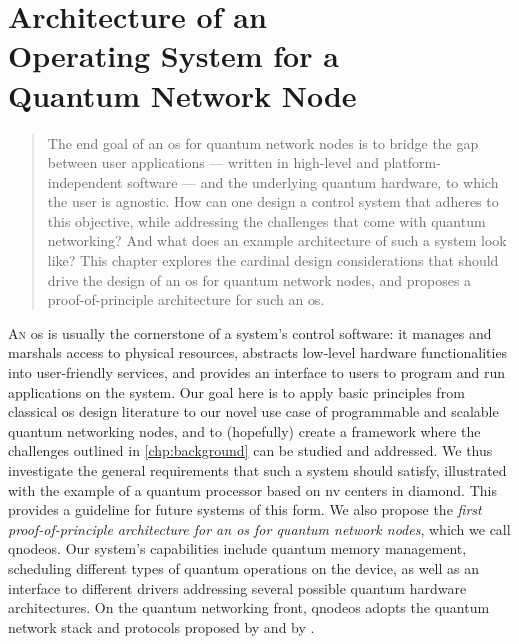 \chapter
 [Architecture of an Operating System for a Quantum Network Node]
 {Architecture of an\\Operating System for a\\Quantum Network Node}
\label{chp:arch}

\begin{abstract}
The end goal of an \acrfull{os} for quantum network nodes is to bridge the gap between user
applications --- written in high-level and platform-independent software --- and the underlying
quantum hardware, to which the user is agnostic. How can one design a control system that adheres to
this objective, while addressing the challenges that come with quantum networking? And what does an
example architecture of such a system look like? This chapter explores the cardinal design
considerations that should drive the design of an \acrshort{os} for quantum network nodes, and
proposes a proof-of-principle architecture for such an \acrshort{os}.
\end{abstract}

\noindent
{}


\newpage

\lettrine{A}{n} \acrfull{os} is usually the cornerstone of a system's control software: it manages
and marshals access to physical resources, abstracts low-level hardware functionalities into
user-friendly services, and provides an interface to users to program and run applications on the
system. Our goal here is to apply basic principles from classical \acrshort{os} design literature to
our novel use case of programmable and scalable quantum networking nodes, and to (hopefully) create
a framework where the challenges outlined in \cref{chp:background} can be studied and addressed. We
thus investigate the general requirements that such a system should satisfy, illustrated with the
example of a quantum processor based on \acrfull{nv} centers in diamond. This provides a guideline
for future systems of this form. We also propose the \emph{first proof-of-principle architecture for
an \acrlong{os} for quantum network nodes}, which we call \acrshort{qnodeos}. Our system's
capabilities include quantum memory management, scheduling different types of quantum operations on
the device, as well as an interface to different drivers addressing several possible quantum
hardware architectures. On the quantum networking front, \acrshort{qnodeos} adopts the quantum
network stack and protocols proposed by \textcite{dahlberg_2019_egp} and by
\textcite{kozlowski_2020_qnp}.

